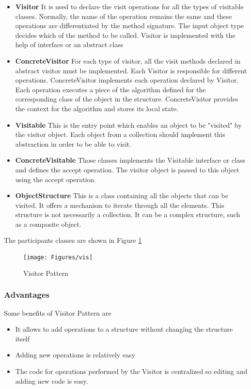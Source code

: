   \begin{itemize}
  	\item \textbf{Visitor} It is used to declare the visit operations for all the types of visitable classes. Normally, the name of the operation remains the same and these operations are differentiated by the method signature. The input object type decides which of the method to be called.  Visitor is implemented with the help of interface or an abstract class
  
  \item \textbf{ConcreteVisitor} For each type of visitor, all the visit methods declared in abstract visitor must be implemented. Each Visitor is responsible for different operations. ConcreteVisitor implements each operation declared by Visitor.  Each operation executes a piece of the
  algorithm defined for the corresponding class
  of the object in the structure. ConcreteVisitor provides the context for the algorithm and stores its local state.
  
  \item \textbf{Visitable} This is the entry point which enables an object to be "visited" by the visitor object. Each object from a collection should implement this abstraction in order to be able to visit.
  
  \item \textbf{ConcreteVisitable} Those classes implements the Visitable interface or class and defines the accept operation. The visitor object is passed to this object using the accept operation. 
  
  \item \textbf{ObjectStructure} This is a class containing all the objects that can be visited. It offers a mechanism to iterate through all the elements. This structure is not necessarily a collection. It can be a complex structure, such as a composite object.
\end{itemize}
 The participants classes are shown in Figure \ref{Fig:3}
 \begin{figure}[H]
 	
 	
 	\centering
 	\texttt{[image: Figures/vis]}
 	\caption{Visitor Pattern}
 	\label{Fig:3} 
 	
 \end{figure}

 
 \subsubsection{Advantages}
  Some benefits of Visitor Pattern are
  \begin{itemize}
  	\item It allows to add operations to a structure without changing the structure itself
   \item Adding new operations is relatively easy
   \item The code for operations performed by the Visitor is centralized so editing and adding new code is easy.
   
\end{itemize}
